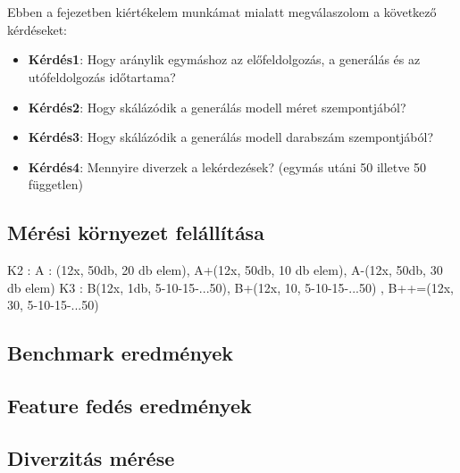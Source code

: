 \chapter{\evaluation}

Ebben a fejezetben kiértékelem munkámat mialatt megválaszolom a következő kérdéseket:

\begin{itemize}
	\item \textbf{Kérdés1}: Hogy aránylik egymáshoz az előfeldolgozás, a generálás és az utófeldolgozás időtartama?
	\item \textbf{Kérdés2}: Hogy skálázódik a generálás modell méret szempontjából?
	\item \textbf{Kérdés3}: Hogy skálázódik a generálás modell darabszám szempontjából?
	\item \textbf{Kérdés4}: Mennyire diverzek a lekérdezések? (egymás utáni 50 illetve 50 független) 
\end{itemize}
\section{Mérési környezet felállítása}

 K2 : A : (12x, 50db, 20 db elem), A+(12x, 50db, 10 db elem), A-(12x, 50db, 30 db elem)
 K3 : B(12x, 1db, 5-10-15-...50), B+(12x, 10, 5-10-15-...50) , B++=(12x, 30, 5-10-15-...50) 





\section{Benchmark eredmények}
\section{Feature fedés eredmények} 

\section{Diverzitás mérése}